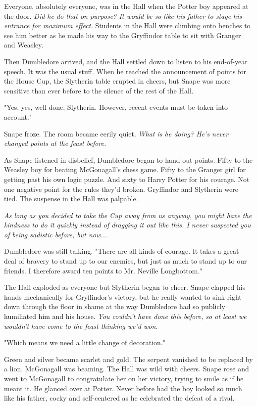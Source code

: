 \documentclass[a4paper,11pt]{article}
\begin{document}
Everyone, absolutely everyone, was in the Hall when the Potter boy appeared at the door. \emph{Did he do that on purpose? It would be so like his father to stage his entrance for maximum effect.} Students in the Hall were climbing onto benches to see him better as he made his way to the Gryffindor table to sit with Granger and Weasley.

Then Dumbledore arrived, and the Hall settled down to listen to his end-of-year speech. It was the usual stuff. When he reached the announcement of points for the House Cup, the Slytherin table erupted in cheers, but Snape was more sensitive than ever before to the silence of the rest of the Hall.

"Yes, yes, well done, Slytherin. However, recent events must be taken into account."

Snape froze. The room became eerily quiet. \emph{What is he doing? He's never changed points at the feast before.}

As Snape listened in disbelief, Dumbledore began to hand out points. Fifty to the Weasley boy for beating McGonagall's chess game. Fifty to the Granger girl for getting past his own logic puzzle. And sixty to Harry Potter for his courage. Not one negative point for the rules they'd broken. Gryffindor and Slytherin were tied. The suspense in the Hall was palpable.

\emph{As long as you decided to take the Cup away from us anyway, you might have the kindness to do it quickly instead of dragging it out like this. I never suspected you of being sadistic before, but now...}

Dumbledore was still talking. "There are all kinds of courage. It takes a great deal of bravery to stand up to our enemies, but just as much to stand up to our friends. I therefore award ten points to Mr. Neville Longbottom."

The Hall exploded as everyone but Slytherin began to cheer. Snape clapped his hands mechanically for Gryffindor's victory, but he really wanted to sink right down through the floor in shame at the way Dumbledore had so publicly humiliated him and his house. \emph{You couldn't have done this before, so at least we wouldn't have come to the feast thinking we'd won.}

"Which means we need a little change of decoration."

Green and silver became scarlet and gold. The serpent vanished to be replaced by a lion. McGonagall was beaming. The Hall was wild with cheers. Snape rose and went to McGonagall to congratulate her on her victory, trying to smile as if he meant it. He glanced over at Potter. Never before had the boy looked so much like his father, cocky and self-centered as he celebrated the defeat of a rival.
\end{document}
